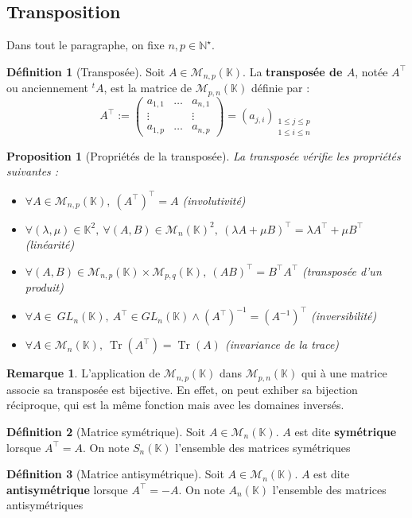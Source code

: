 \documentclass[french]{book}
\newcommand{\N}{\mathbb{N}}
\newcommand{\K}{\mathbb{K}}
\newcommand{\st}{^\star}
\newcommand{\inv}{^{-1}}
\theoremstyle{plain}
\newtheorem{prop}{Proposition}[chapter]
\theoremstyle{definition}
\newtheorem{dfn}{Définition}[chapter]
\newtheorem{rmq}{Remarque}[chapter]
\theoremstyle{remark}
\DeclareMathOperator{\tr}{Tr}
\begin{document}
\subsection{Transposition}
Dans tout le paragraphe, on fixe $n,p\in\N\st$.
\begin{dfn}[Transposée]
	Soit $A\in\mathcal{M}_{n,p}(\K)$. La \textbf{transposée de $A$}, notée $A^\top$ ou anciennement $^tA$, est la matrice de $\mathcal{M}_{p,n}(\K)$ définie par : $$A^\top:=\begin{pmatrix}a_{1,1}&\ldots&a_{n,1}\\ \vdots&&\vdots\\ a_{1,p}&\ldots&a_{n,p}\end{pmatrix}=(a_{j,i})_{\substack{1\leqslant j\leqslant p \\ 1\leqslant i\leqslant n}}$$
\end{dfn}
\begin{prop}[Propriétés de la transposée]
	La transposée vérifie les propriétés suivantes :\begin{itemize}
		\item $\forall A\in\mathcal{M}_{n,p}(\K),\ (A^\top)^\top=A$ (involutivité)
		\item $\forall(\lambda,\mu)\in\K^2,\ \forall (A,B)\in\mathcal{M}_n(\K)^2,\ (\lambda A+\mu B)^\top=\lambda A^\top+\mu B^\top$ (linéarité)
		\item $\forall(A,B)\in\mathcal{M}_{n,p}(\K)\times\mathcal{M}_{p,q}(\K),\ (AB)^\top=B^\top A^\top$ (transposée d'un produit)
		\item $\forall A\in\ GL_n(\K),\ A^\top\in GL_n(\K)\land (A^\top)\inv=(A\inv)^\top$ (inversibilité)
		\item $\forall A\in\mathcal{M}_n(\K),\ \tr(A^\top)=\tr(A)$ (invariance de la trace)
	\end{itemize}
\end{prop}
\begin{rmq}
	L'application de $\mathcal{M}_{n,p}(\K)$ dans $\mathcal{M}_{p,n}(\K)$ qui à une matrice associe sa transposée est bijective. En effet, on peut exhiber sa bijection réciproque, qui est la même fonction mais avec les domaines inversés.
\end{rmq}
\begin{dfn}[Matrice symétrique]
	Soit $A\in\mathcal{M}_n(\K)$. $A$ est dite \textbf{symétrique} lorsque $A^\top=A$. On note $S_n(\K)$ l'ensemble des matrices symétriques
\end{dfn}
\begin{dfn}[Matrice antisymétrique]
	Soit $A\in\mathcal{M}_n(\K)$. $A$ est dite \textbf{antisymétrique} lorsque $A^\top=-A$. On note $A_n(\K)$ l'ensemble des matrices antisymétriques
\end{dfn}
\end{document}
